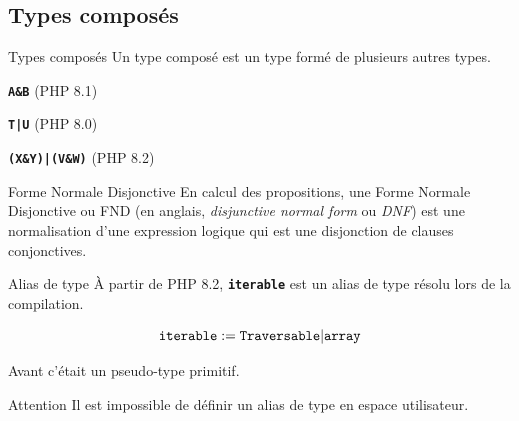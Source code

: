\documentclass[10pt]{beamer}
\begin{document}
\subsection{Types composés}
\begin{frame}{Types composés}
    Un type composé est un type formé de plusieurs autres types.
    \begin{description}
     \item[Type d'intersection :] \texttt{\textbf{A\&B}} (PHP 8.1)
     \item[Type d'union simple :] \texttt{\textbf{T|U}} (PHP 8.0)
     \item[Type FND :] \texttt{\textbf{(X\&Y)|(V\&W)}} (PHP 8.2)
    \end{description}
    \begin{block}{Forme Normale Disjonctive}
        En calcul des propositions, une \alert{Forme Normale Disjonctive} ou \alert{FND} (en anglais, \emph{disjunctive normal form} ou \emph{DNF}) est une normalisation d'une expression logique qui est une disjonction de clauses conjonctives.
        \cite{noauthor_forme_2022}
    \end{block}
\end{frame}
\begin{frame}{Alias de type}
    À partir de PHP 8.2, \texttt{\textbf{iterable}} est un alias de type résolu lors de la compilation.

    \begin{displaymath}
        \text{\texttt{iterable}} := \text{\texttt{Traversable}}|\text{\texttt{array}} 
    \end{displaymath}

    Avant c'était un pseudo-type primitif.
    
    \begin{alertblock}{Attention}
        Il est impossible de définir un alias de type en espace utilisateur.
    \end{alertblock}
\end{frame}
\end{document}
